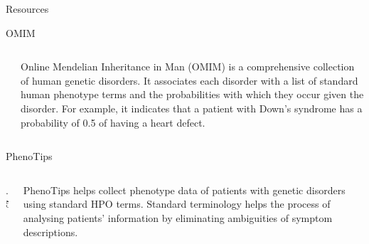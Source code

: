 \documentclass[final]{beamer} %
\begin{document}
\begin{frame}{}
\begin{columns}[T]
\begin{column}{0.3\linewidth}
\begin{block}{\Huge Resources}
    \begin{block}{\Large OMIM}
      \begin{columns}[T]
        \begin{column}{.5\textwidth}
		\centering
		\vspace{1cm}
        \end{column}
        
        \begin{column}{.5\textwidth}
        \Large
        Online Mendelian Inheritance in Man (OMIM) is a comprehensive collection of human genetic disorders. It associates each disorder with a list of standard human phenotype terms and the probabilities with which they occur given the disorder. For example, it indicates that a patient with Down's syndrome has a probability of 0.5 of having a heart defect.
       \end{column}
    \end{columns}
    \end{block}

  

   \begin{block}{\Large PhenoTips}
      \begin{columns}[T]
        \begin{column} {.5\textwidth}
           \vspace{4cm}
           \centering
        \end{column}
        
        \begin{column}{.5\textwidth}
          \Large
          PhenoTips helps collect phenotype data of patients with genetic disorders using standard HPO terms. Standard terminology helps the process of analysing patients' information by eliminating ambiguities of symptom descriptions.
        \end{column}
      \end{columns}
    \end{block}


\end{block}
\end{column}
\end{columns}
\end{frame}
\end{document}
